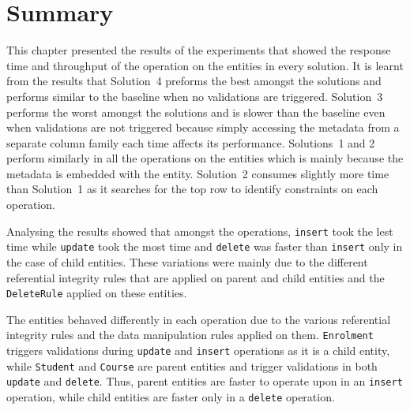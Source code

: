 \section{Summary} \label{s:results-summary}

This chapter presented the results of the experiments that showed the response
time and throughput of the operation on the entities in every solution. It is
learnt from the results that Solution~4 preforms the best amongst the solutions
and performs similar to the baseline when no validations are triggered.
Solution~3 performs the worst amongst the solutions and is slower than the
baseline even when validations are not triggered because simply accessing the
metadata from a separate column family each time affects its performance.
Solutions~1 and 2 perform similarly in all the operations on the entities which
is mainly because the metadata is embedded with the entity. Solution~2 consumes
slightly more time than Solution~1 as it searches for the top row to identify
constraints on each operation. 

Analysing the results showed that amongst the operations, \texttt{insert} took
the lest time while \texttt{update} took the most time and \texttt{delete} was
faster than \texttt{insert} only in the case of child entities. These variations
were mainly due to the different referential integrity rules that are applied
on parent and child entities and the \texttt{DeleteRule} applied on these
entities.

The entities behaved differently in each operation due to the various
referential integrity rules and the data manipulation rules applied on them.
\texttt{Enrolment} triggers validations during
\texttt{update} and \texttt{insert} operations as it is a child entity, while
\texttt{Student} and \texttt{Course} are parent entities and trigger validations in both
\texttt{update} and \texttt{delete}. Thus, parent entities are faster to operate
upon in an \texttt{insert} operation, while child entities are faster only in a
\texttt{delete} operation. 
	